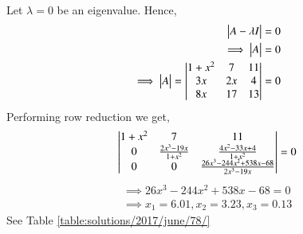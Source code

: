 Let $\lambda = 0$ be an eigenvalue. Hence,
\begin{align}
\begin{vmatrix}A-\lambda I\end{vmatrix} = 0\\
\implies \begin{vmatrix}A\end{vmatrix} = 0 \\
\implies \begin{vmatrix}A\end{vmatrix} = \begin{vmatrix}1+x^2&7&11\\3x&2x&4\\8x&17&13\end{vmatrix} = 0
\end{align}
Performing row reduction we get,
\begin{align}
\begin{vmatrix}1+x^2&7&11\\0&\frac{2x^3 - 19x}{1+x^2}&\frac{4x^2 - 33x +4}{1+x^2}\\0&0&\frac{26x^3 - 244x^2 + 538x - 68}{2x^3 - 19x}\end{vmatrix} = 0
\end{align}
\begin{align}
\implies 26 x^3 - 244 x^2 + 538 x - 68 = 0\\
\implies x_1 = 6.01, x_2 = 3.23, x_3 = 0.13
\label{eq:solutions/2017/june/78/x}
\end{align} 
%
See Table \ref{table:solutions/2017/june/78/}

